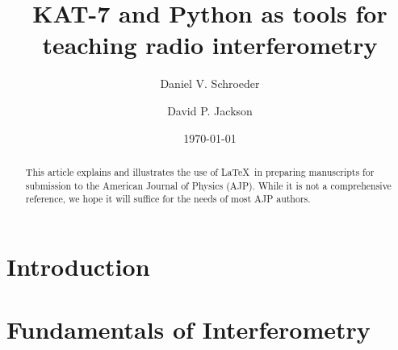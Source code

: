 \documentclass[prb,preprint]{revtex4-1}
\begin{document}

\title{KAT-7 and Python as tools for teaching radio interferometry}

\author{Daniel V. Schroeder}

\author{David P. Jackson}


\date{\today}

\begin{abstract}
This article explains and illustrates the use of \LaTeX\ in preparing manuscripts
for submission to the American Journal of Physics (AJP). While it is not a
comprehensive reference, we hope it will suffice for the needs of most
AJP authors.
\end{abstract}

\maketitle %


\section{Introduction} %

\section{Fundamentals of Interferometry}
\end{document}
